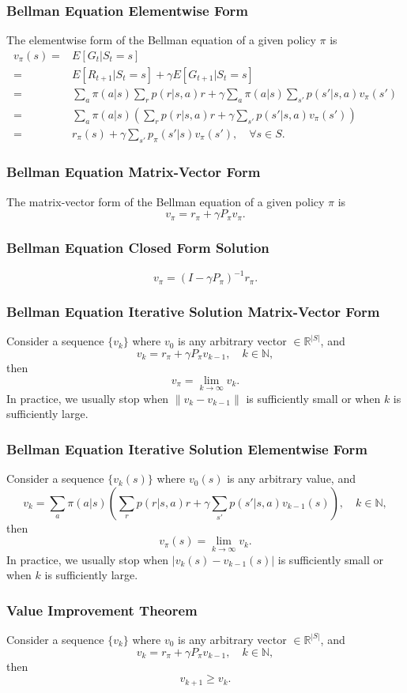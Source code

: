 \documentclass[a4paper,12pt]{report}
\begin{document}
\subsubsection{Bellman Equation Elementwise Form}
The elementwise form of the Bellman equation of a given policy $\pi$ is
\[\begin{aligned}
v_{\pi}(s)=& E[G_t|S_t=s]\\
=& E[R_{t+1}|S_t=s]+\gamma E[G_{t+1}|S_t=s]\\
=&\sum_a\pi(a|s)\sum_rp(r|s,a)r+\gamma\sum_a\pi(a|s)\sum_{s'}p(s'|s,a)v_{\pi}(s')\\
=&\sum_a\pi(a|s)\left(\sum_rp(r|s,a)r+\gamma\sum_{s'}p(s'|s,a)v_{\pi}(s')\right)\\
=&r_{\pi}(s)+\gamma\sum_{s'}p_{\pi}(s'|s)v_{\pi}(s'),\quad\forall s\in S.
\end{aligned}\]
\subsubsection{Bellman Equation Matrix-Vector Form}
The matrix-vector form of the Bellman equation of a given policy $\pi$ is
\[v_{\pi}=r_{\pi}+\gamma P_{\pi}v_{\pi}.\]
\subsubsection{Bellman Equation Closed Form Solution}
\[v_{\pi}=(I-\gamma P_{\pi})^{-1}r_{\pi}.\]
\subsubsection{Bellman Equation Iterative Solution Matrix-Vector Form}
Consider a sequence $\{v_k\}$ where $v_0$ is any arbitrary vector $\in\mathbb{R}^{|S|}$, and
\[v_k=r_{\pi}+\gamma P_{\pi}v_{k-1},\quad k\in\mathbb{N},\]
then
\[v_{\pi}=\lim_{k\to\infty}v_k.\]
In practice, we usually stop when $\|v_k-v_{k-1}\|$ is sufficiently small or when $k$ is sufficiently large.
\subsubsection{Bellman Equation Iterative Solution Elementwise Form}
Consider a sequence $\{v_k(s)\}$ where $v_0(s)$ is any arbitrary value, and
\[v_k=\sum_a\pi(a|s)\left(\sum_rp(r|s,a)r+\gamma\sum_{s'}p(s'|s,a)v_{k-1}(s)\right),\quad k\in\mathbb{N},\]
then
\[v_{\pi}(s)=\lim_{k\to\infty}v_k.\]
In practice, we usually stop when $|v_k(s)-v_{k-1}(s)|$ is sufficiently small or when $k$ is sufficiently large.
\subsubsection{Value Improvement Theorem}
Consider a sequence $\{v_k\}$ where $v_0$ is any arbitrary vector $\in\mathbb{R}^{|S|}$, and
\[v_k=r_{\pi}+\gamma P_{\pi}v_{k-1},\quad k\in\mathbb{N},\]
then
\[v_{k+1}\geq v_k.\] 
\end{document}
